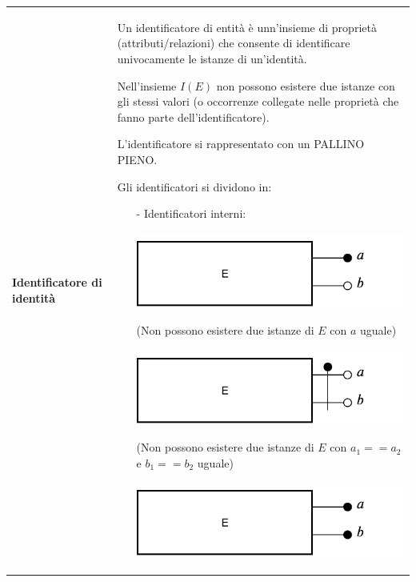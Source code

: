 \documentclass[a4paper, 10pt]{report}
\begin{document}
\begin{longtable}{| p{} | p{} |}
\textbf{Identificatore di identità} & Un identificatore di entità è unn'insieme di proprietà (attributi/relazioni) che consente di identificare univocamente le istanze di un'identità.

Nell'insieme $I(E)$ non possono esistere due istanze con gli stessi valori (o occorrenze collegate nelle proprietà che fanno parte dell'identificatore). 

L'identificatore si rappresentato con un PALLINO PIENO. 

Gli identificatori si dividono in:
\begin{itemize}
\item[-]Identificatori interni:

\begin{center}
\includegraphics[scale=0.55]{14ottobre02.pdf}
\end{center}

(Non possono esistere due istanze di $E$ con $a$ uguale)

\begin{center}
\includegraphics[scale=0.55]{14ottobre03.pdf}
\end{center}

(Non possono esistere due istanze di $E$ con $a_1 == a_2$ e $b_1 == b_2$ uguale)

\begin{center}
\includegraphics[scale=0.55]{14ottobre04.pdf}
\end{center}


\end{itemize}
\end{longtable}
\end{document}
